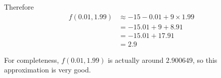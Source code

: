 \documentclass[a4paper]{article}
\begin{document}
Therefore \begin{align*}
f(0.01, 1.99) &\approx -15 - 0.01 + 9 \times 1.99\\
&= -15.01 + 9 + 8.91\\
&= -15.01 + 17.91\\
&= 2.9
\end{align*}

For completeness, $f(0.01, 1.99)$ is actually around $2.900649$, so this approximation is very good.

\subsection{~}


\subsection{~}


\end{document}
